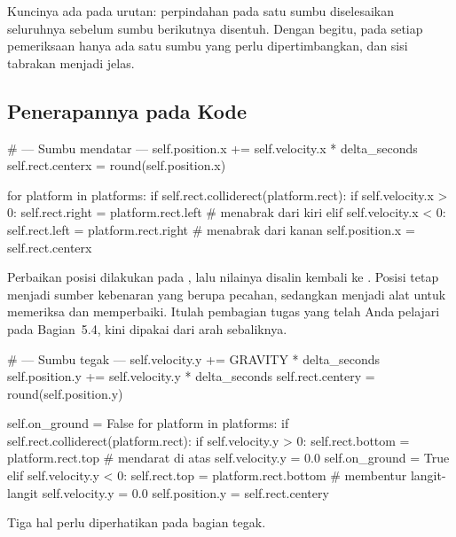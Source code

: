 Kuncinya ada pada urutan: perpindahan pada satu sumbu diselesaikan seluruhnya
sebelum sumbu berikutnya disentuh. Dengan begitu, pada setiap pemeriksaan hanya
ada satu sumbu yang perlu dipertimbangkan, dan sisi tabrakan menjadi jelas.

\subsection{Penerapannya pada Kode}

\begin{kodekeluaran}
# --- Sumbu mendatar ---
self.position.x += self.velocity.x * delta_seconds
self.rect.centerx = round(self.position.x)

for platform in platforms:
    if self.rect.colliderect(platform.rect):
        if self.velocity.x > 0:
            self.rect.right = platform.rect.left      # menabrak dari kiri
        elif self.velocity.x < 0:
            self.rect.left = platform.rect.right      # menabrak dari kanan
        self.position.x = self.rect.centerx
\end{kodekeluaran}

Perbaikan posisi dilakukan pada , lalu nilainya
disalin kembali ke . Posisi tetap menjadi sumber kebenaran yang
berupa pecahan, sedangkan  menjadi alat untuk memeriksa dan
memperbaiki. Itulah pembagian tugas yang telah Anda pelajari pada
Bagian~5.4, kini dipakai dari arah sebaliknya.

\begin{kodekeluaran}
# --- Sumbu tegak ---
self.velocity.y += GRAVITY * delta_seconds
self.position.y += self.velocity.y * delta_seconds
self.rect.centery = round(self.position.y)

self.on_ground = False
for platform in platforms:
    if self.rect.colliderect(platform.rect):
        if self.velocity.y > 0:
            self.rect.bottom = platform.rect.top      # mendarat di atas
            self.velocity.y = 0.0
            self.on_ground = True
        elif self.velocity.y < 0:
            self.rect.top = platform.rect.bottom      # membentur langit-langit
            self.velocity.y = 0.0
        self.position.y = self.rect.centery
\end{kodekeluaran}

Tiga hal perlu diperhatikan pada bagian tegak.

